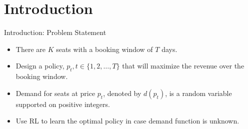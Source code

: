 \section{Introduction}

\begin{frame}{Introduction: Problem Statement}
\begin{itemize}
    \setlength\itemsep{1.5em}
    \item There are $K$ seats with a booking window of $T$ days.
    \item Design a policy, $p_t, t \in \{1, 2, \ldots, T\}$ that will maximize the revenue over the booking window.
    \item Demand for seats at price $p_t$, denoted by $d(p_t)$, is a random variable supported on positive integers.
    \item Use RL to learn the optimal policy in case demand function is unknown.
\end{itemize}
\end{frame}

